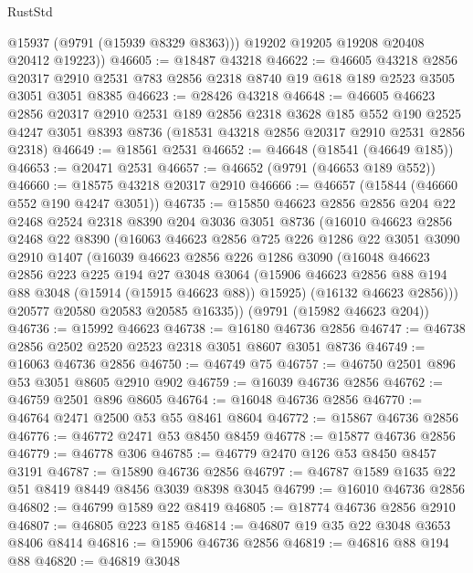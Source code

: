 \begin{lexlean}{RustStd}
\begin{coremodule}
          @15937
          (@9791 (@15939 @8329 @8363)))
        @19202
        @19205
        @19208
        @20408
        @20412
        @19223))
@46605 := @18487 @43218
@46622 := @46605
    @43218
    @2856
    @20317
    @2910
    @2531
    @783
    @2856
    @2318
    @8740
    @19
    @618
    @189
    @2523
    @3505
    @3051
    @3051
    @8385
@46623 := @28426 @43218
@46648 := @46605
    @46623
    @2856
    @20317
    @2910
    @2531
    @189
    @2856
    @2318
    @3628
    @185
    @552
    @190
    @2525
    @4247
    @3051
    @8393
    @8736
    (@18531 @43218 @2856 @20317 @2910 @2531 @2856 @2318)
@46649 := @18561 @2531
@46652 := @46648 (@18541 (@46649 @185))
@46653 := @20471 @2531
@46657 := @46652 (@9791 (@46653 @189 @552))
@46660 := @18575 @43218 @20317 @2910
@46666 := @46657 (@15844 (@46660 @552 @190 @4247 @3051))
@46735 := @15850
    @46623
    @2856
    @2856
    @204
    @22
    @2468
    @2524
    @2318
    @8390
    @204
    @3036
    @3051
    @8736
    (@16010
      @46623
      @2856
      @2468
      @22
      @8390
      (@16063
        @46623
        @2856
        @725
        @226
        @1286
        @22
        @3051
        @3090
        @2910
        @1407
        (@16039
          @46623
          @2856
          @226
          @1286
          @3090
          (@16048
            @46623
            @2856
            @223
            @225
            @194
            @27
            @3048
            @3064
            (@15906 @46623 @2856 @88 @194 @88 @3048 (@15914 (@15915 @46623 @88)) @15925)
            (@16132 @46623 @2856)))
        @20577
        @20580
        @20583
        @20585
        @16335))
    (@9791 (@15982 @46623 @204))
@46736 := @15992 @46623
@46738 := @16180 @46736 @2856
@46747 := @46738 @2856 @2502 @2520 @2523 @2318 @3051 @8607 @3051 @8736
@46749 := @16063 @46736 @2856
@46750 := @46749 @75
@46757 := @46750 @2501 @896 @53 @3051 @8605 @2910 @902
@46759 := @16039 @46736 @2856
@46762 := @46759 @2501 @896 @8605
@46764 := @16048 @46736 @2856
@46770 := @46764 @2471 @2500 @53 @55 @8461 @8604
@46772 := @15867 @46736 @2856
@46776 := @46772 @2471 @53 @8450 @8459
@46778 := @15877 @46736 @2856
@46779 := @46778 @306
@46785 := @46779 @2470 @126 @53 @8450 @8457 @3191
@46787 := @15890 @46736 @2856
@46797 := @46787 @1589 @1635 @22 @51 @8419 @8449 @8456 @3039 @8398 @3045
@46799 := @16010 @46736 @2856
@46802 := @46799 @1589 @22 @8419
@46805 := @18774 @46736 @2856 @2910
@46807 := @46805 @223 @185
@46814 := @46807 @19 @35 @22 @3048 @3653 @8406 @8414
@46816 := @15906 @46736 @2856
@46819 := @46816 @88 @194 @88
@46820 := @46819 @3048

\end{coremodule}
\end{lexlean}
